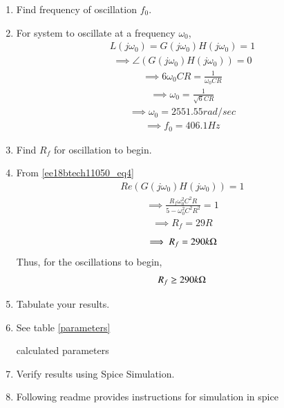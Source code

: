 \begin{enumerate}[label=\thesection.\arabic*.,ref=\thesection.\theenumi]
\item Find frequency of oscillation $f_0$.
\item \solution 
For system to oscillate at a frequency $\omega_0$, 
\begin{align}
    L(j\omega_0) = G(j\omega_0)H(j\omega_0) = 1
    \label{ee18btech11050_eq4}
\end{align}
\begin{align}
    \implies \angle(G(j\omega_0)H(j\omega_0)) = 0
\end{align}
\begin{align}
    \implies 6\omega_0 CR = \frac{1}{\omega_0 CR}
\end{align}
\begin{align}
    \implies \omega_0 = \frac{1}{\sqrt{6}CR}
\end{align}
\begin{align}
    \implies \omega_0 = 2551.55 rad/sec
\end{align}
\begin{align}
    \implies f_0 = 406.1 Hz
\end{align}
\item Find $R_f$ for oscillation to begin.
\item \solution From \eqref{ee18btech11050_eq4}
\begin{align}
    Re(G(j\omega_0)H(j\omega_0)) = 1
\end{align}
\begin{align}
    \implies \frac{R_f\omega_0^2C^2R}{5-\omega_0^2C^2R^2} = 1
\end{align}
\begin{align}
    \implies R_f = 29R
\end{align}
\begin{align}
    \implies R_f = 290 k\ohm
\end{align}
Thus, for the oscillations to begin,
\begin{align}
    R_f \geq 290 k\ohm
\end{align}
\item Tabulate your results.
\item \solution See table \ref{parameters}
\begin{table}[!ht]
\centering

\caption{calculated parameters}
\label{parameters}
\end{table}

\item Verify results using Spice Simulation.

\item \solution Following readme provides instructions for simulation in spice


\end{enumerate}
